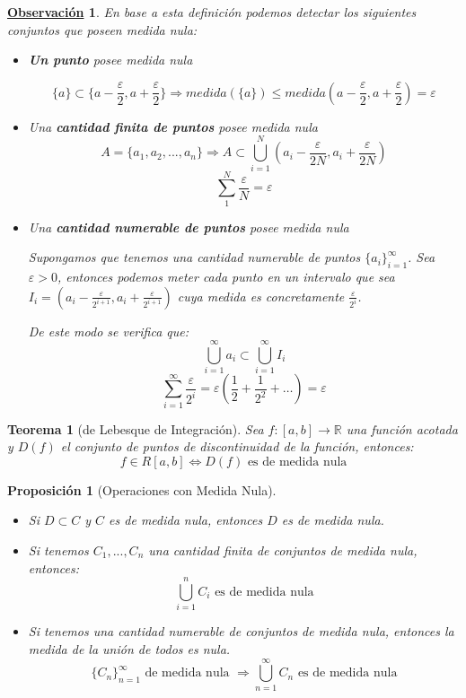 \documentclass[10pt,a4paper,openright]{book}
\theoremstyle{break}
\newtheorem{theo}{Teorema}[chapter]
\newtheorem{prop}{Proposición}[chapter]
\newtheorem{obs}{\underline{Observación}}[chapter]
\begin{document}
\begin{obs}
En base a esta definición podemos detectar los siguientes conjuntos que poseen medida nula:
\begin{itemize}
\item \textbf{Un punto} posee medida nula

$$\{a\}\subset \{a-\frac{\varepsilon}{2}, a +\frac{\varepsilon}{2}\}\Rightarrow medida(\{a\})\leq medida\left(a-\frac{\varepsilon}{2}, a +\frac{\varepsilon}{2}\right) = \varepsilon$$

\item Una \textbf{cantidad finita de puntos} posee medida nula
$$A = \{a_1, a_2,...,a_n\}\Rightarrow A \subset \bigcup^N_{i=1} \left(a_i - \frac{\varepsilon}{2N}, a_i + \frac{\varepsilon}{2N}\right)$$
$$\sum_{1}^{N} \frac{\varepsilon}{N} = \varepsilon$$

\item Una \textbf{cantidad numerable de puntos} posee medida nula

Supongamos que tenemos una cantidad numerable de puntos $\{a_i\}_{i=1}^\infty$. Sea $\varepsilon >0$, entonces podemos meter cada punto en un intervalo que sea $I_i=\left(a_i-\frac{\varepsilon}{2^{i+1}}, a_i + \frac{\varepsilon}{2^{i+1}}\right)$ cuya medida es concretamente $\frac{\varepsilon}{2^i}$.

De este modo se verifica que:
$$\bigcup^\infty_{i=1} a_i \subset \bigcup^\infty_{i=1} I_i$$
$$\sum_{i=1}^{\infty} \frac{\varepsilon}{2^i} = \varepsilon \left(\frac{1}{2} + \frac{1}{2^2} + \ldots\right) = \varepsilon $$
\end{itemize}
\end{obs}

\begin{theo}[de Lebesque de Integración]
Sea $f:[a,b]\rightarrow \mathbb R$ una función acotada y $D(f)$ el conjunto de puntos de discontinuidad de la función, entonces:
$$f\in R[a,b]\Leftrightarrow D(f) \mbox{ es de medida nula}$$
\end{theo}

\begin{prop}[Operaciones con Medida Nula]
\begin{itemize}
\item Si $D\subset C$ y $C$ es de medida nula, entonces $D$ es de medida nula.
\item Si tenemos $C_1, ..., C_n$ una cantidad finita de conjuntos de medida nula, entonces:
$$\bigcup_{i =1}^{n} C_i\mbox{ es de medida nula}$$
\item Si tenemos una cantidad numerable de conjuntos de medida nula, entonces la medida de la unión de todos es nula.
$$\{C_n\}_{n=1}^\infty\mbox{ de medida nula }\Rightarrow \bigcup_{n=1}^{\infty} C_n \mbox{ es de medida nula}$$
\end{itemize}
\end{prop}
\end{document}
